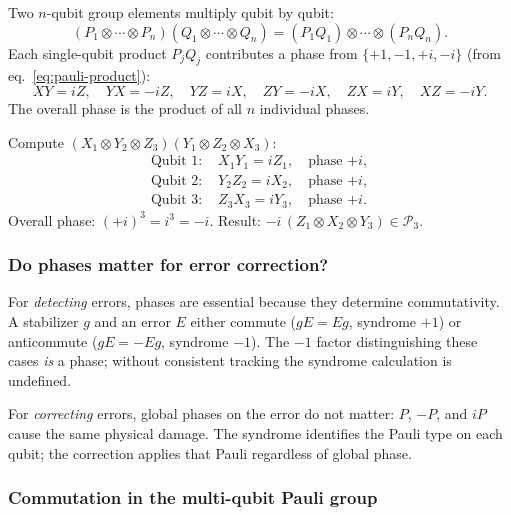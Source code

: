\documentclass[11pt, a4paper]{article}
\theoremstyle{definition}
\theoremstyle{plain}
\theoremstyle{remark}
\begin{document}
Two $n$-qubit group elements multiply qubit by qubit:
\[
  (P_1 \otimes \cdots \otimes P_n)(Q_1 \otimes \cdots \otimes Q_n)
  = (P_1 Q_1) \otimes \cdots \otimes (P_n Q_n).
\]
Each single-qubit product $P_j Q_j$ contributes a phase from
$\{+1,-1,+i,-i\}$ (from eq.~\eqref{eq:pauli-product}):
\[
  XY = iZ,\quad YX = -iZ,\quad
  YZ = iX,\quad ZY = -iX,\quad
  ZX = iY,\quad XZ = -iY.
\]
The overall phase is the product of all $n$ individual phases.

\begin{workedexample}
Compute $(X_1 \otimes Y_2 \otimes Z_3)(Y_1 \otimes Z_2 \otimes X_3)$:
\begin{align*}
  \text{Qubit 1: } & X_1 Y_1 = iZ_1, \quad \text{phase } {+i},\\
  \text{Qubit 2: } & Y_2 Z_2 = iX_2, \quad \text{phase } {+i},\\
  \text{Qubit 3: } & Z_3 X_3 = iY_3, \quad \text{phase } {+i}.
\end{align*}
Overall phase: $(+i)^3 = i^3 = -i$.
Result: $-i\,(Z_1 \otimes X_2 \otimes Y_3) \in \mathcal{P}_3$.\;\checkmark
\end{workedexample}

\subsubsection{Do phases matter for error correction?}

For \emph{detecting} errors, phases are essential because they determine
commutativity.  A stabilizer $g$ and an error $E$ either commute
($gE = Eg$, syndrome $+1$) or anticommute ($gE = -Eg$, syndrome $-1$).
The $-1$ factor distinguishing these cases \emph{is} a phase; without
consistent tracking the syndrome calculation is undefined.

For \emph{correcting} errors, global phases on the error do not matter:
$P$, $-P$, and $iP$ cause the same physical damage.  The syndrome
identifies the Pauli type on each qubit; the correction applies that Pauli
regardless of global phase.

\subsubsection{Commutation in the multi-qubit Pauli group}
\end{document}
